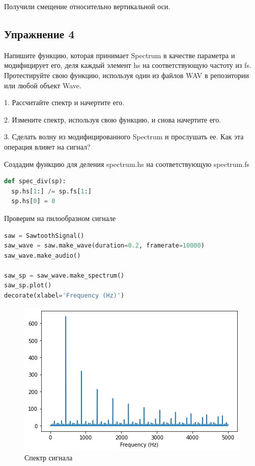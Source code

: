 Получили смещение относительно вертикальной оси.


\subsection{Упражнение 4}

Напишите функцию, которая принимает Spectrum в качестве параметра и модифицирует его, деля каждый элемент hs на соответствующую частоту из fs. Протестируйте свою функцию, используя один из файлов WAV в репозитории или любой объект Wave.

1. Рассчитайте спектр и начертите его.

2. Измените спектр, используя свою функцию, и снова начертите его.

3. Сделать волну из модифицированного Spectrum и прослушать ее. Как эта операция влияет на сигнал?

Создадим функцию для деления spectrum.hs на соответствующую spectrum.fs

\begin{lstlisting}[language=Python]
def spec_div(sp):
  sp.hs[1:] /= sp.fs[1:]
  sp.hs[0] = 0
\end{lstlisting}

Проверим на пилообразном сигнале

\begin{lstlisting}[language=Python]
saw = SawtoothSignal()
saw_wave = saw.make_wave(duration=0.2, framerate=10000)
saw_wave.make_audio()

saw_sp = saw_wave.make_spectrum()
saw_sp.plot()
decorate(xlabel='Frequency (Hz)')
\end{lstlisting}

\begin{figure}[H]
	\begin{center}
		\includegraphics[scale=1]{fig/lab02/lab02_10.png}
		\caption{Спектр сигнала}
	\end{center}
\end{figure}

